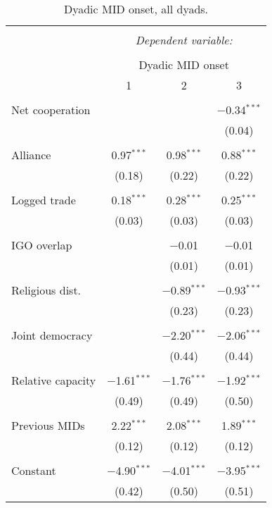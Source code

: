 \documentclass[10pt,]{article}
\begin{document}
\begin{table}[!htbp] \centering 
  \caption{\label{tab:MidTable}Dyadic MID onset, all dyads.} 
  \label{} 
\begin{tabular}{@{\extracolsep{5pt}}lccc} 
\\[-1.8ex]\hline 
\hline \\[-1.8ex] 
 & \multicolumn{3}{c}{\textit{Dependent variable:}} \\ 
\cline{2-4} 
\\[-1.8ex] & \multicolumn{3}{c}{Dyadic MID onset} \\ 
 & 1 & 2 & 3 \\ 
\hline \\[-1.8ex] 
 Net cooperation &  &  & $-$0.34$^{***}$ \\ 
  &  &  & (0.04) \\ 
  & & & \\ 
 Alliance & 0.97$^{***}$ & 0.98$^{***}$ & 0.88$^{***}$ \\ 
  & (0.18) & (0.22) & (0.22) \\ 
  & & & \\ 
 Logged trade & 0.18$^{***}$ & 0.28$^{***}$ & 0.25$^{***}$ \\ 
  & (0.03) & (0.03) & (0.03) \\ 
  & & & \\ 
 IGO overlap &  & $-$0.01 & $-$0.01 \\ 
  &  & (0.01) & (0.01) \\ 
  & & & \\ 
 Religious dist. &  & $-$0.89$^{***}$ & $-$0.93$^{***}$ \\ 
  &  & (0.23) & (0.23) \\ 
  & & & \\ 
 Joint democracy &  & $-$2.20$^{***}$ & $-$2.06$^{***}$ \\ 
  &  & (0.44) & (0.44) \\ 
  & & & \\ 
 Relative capacity & $-$1.61$^{***}$ & $-$1.76$^{***}$ & $-$1.92$^{***}$ \\ 
  & (0.49) & (0.49) & (0.50) \\ 
  & & & \\ 
 Previous MIDs & 2.22$^{***}$ & 2.08$^{***}$ & 1.89$^{***}$ \\ 
  & (0.12) & (0.12) & (0.12) \\ 
  & & & \\ 
 Constant & $-$4.90$^{***}$ & $-$4.01$^{***}$ & $-$3.95$^{***}$ \\ 
  & (0.42) & (0.50) & (0.51) \\ 

\end{tabular}
\end{table}
\end{document}
